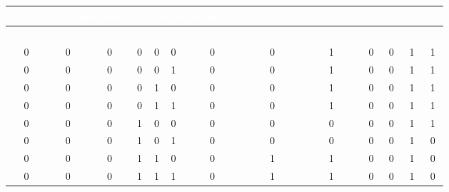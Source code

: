 \documentclass[12pt, letterpaper]{article}
\begin{document}
\begin{table}[H]
\renewcommand{\arraystretch}{1.2}
\begin{center}
    \begin{tabular}{|ccc|ccc|ccc|cccc|}
    \hline
    \rowcolor{black!80}
    \multicolumn{3}{|c|}{\textcolor{white}{\textbf{Estado Actual}}} & \multicolumn{3}{c|}{\textcolor{white}{\textbf{Entradas}}} & \multicolumn{3}{c|}{\textcolor{white}{\textbf{Estado Siguiente}}} & \multicolumn{4}{c|}{\textcolor{white}{\textbf{Salidas}}} \\
    \hline
    \rowcolor{black!80}
    \textcolor{white}{\textbf{$P_2(t)$}} & \textcolor{white}{\textbf{$P_1(t)$}} & \textcolor{white}{\textbf{$P_0(t)$}} & \textcolor{white}{\textbf{$X$}} & \textcolor{white}{\textbf{$Y$}} & \textcolor{white}{\textbf{$Z$}} & \textcolor{white}{\textbf{$L_2(t+1)$}} & \textcolor{white}{\textbf{$L_1(t+1)$}} & \textcolor{white}{\textbf{$L_0(t+1)$}} & \textcolor{white}{\textbf{$S_1$}} & \textcolor{white}{\textbf{$S_0$}} & \textcolor{white}{\textbf{$\overline{U_1}$}} & \textcolor{white}{\textbf{$\overline{U_0}$}} \\
    \hline
    0 & 0 & 0 & 0 & 0 & 0 & 0 & 0 & 1 & \cellcolor{ForestGreen!90}0 & \cellcolor{ForestGreen!90}0 & \cellcolor{ForestGreen!90}1 & \cellcolor{ForestGreen!90}1 \\
    0 & 0 & 0 & 0 & 0 & 1 & 0 & 0 & 1 & \cellcolor{ForestGreen!90}0 & \cellcolor{ForestGreen!90}0 & \cellcolor{ForestGreen!90}1 & \cellcolor{ForestGreen!90}1 \\
    0 & 0 & 0 & 0 & 1 & 0 & 0 & 0 & 1 & \cellcolor{ForestGreen!90}0 & \cellcolor{ForestGreen!90}0 & \cellcolor{ForestGreen!90}1 & \cellcolor{ForestGreen!90}1 \\
    0 & 0 & 0 & 0 & 1 & 1 & 0 & 0 & 1 & \cellcolor{ForestGreen!90}0 & \cellcolor{ForestGreen!90}0 & \cellcolor{ForestGreen!90}1 & \cellcolor{ForestGreen!90}1 \\
    0 & 0 & 0 & 1 & 0 & 0 & 0 & 0 & 0 & \cellcolor{ForestGreen!90}0 & \cellcolor{ForestGreen!90}0 & \cellcolor{ForestGreen!90}1 & \cellcolor{ForestGreen!90}1\\
    0 & 0 & 0 & 1 & 0 & 1 & 0 & 0 & 0 & \cellcolor{ForestGreen!90}0 & \cellcolor{ForestGreen!90}0 & \cellcolor{ForestGreen!90}1 & \cellcolor{ForestGreen!90}0\\
    0 & 0 & 0 & 1 & 1 & 0 & 0 & 1 & 1 & \cellcolor{ForestGreen!90}0 & \cellcolor{ForestGreen!90}0 & \cellcolor{ForestGreen!90}1 & \cellcolor{ForestGreen!90}0\\
    0 & 0 & 0 & 1 & 1 & 1 & 0 & 1 & 1 & \cellcolor{ForestGreen!90}0 & \cellcolor{ForestGreen!90}0 & \cellcolor{ForestGreen!90}1 & \cellcolor{ForestGreen!90}0\\

\end{tabular}
\end{center}
\end{table}
\end{document}
